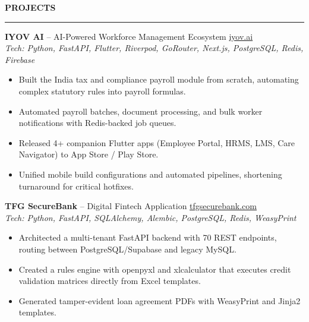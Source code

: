 \documentclass{resume}
\renewenvironment{rSection}[1]{
    \vspace{8pt}
    \noindent
    {\bfseries\MakeUppercase{#1}}
    \par
    \vspace{-3.5pt}
    \noindent\rule{\textwidth}{0.4pt}
    \par
    \vspace{4pt}
}{
    \vspace{3pt}
}
\begin{document}
\begin{rSection}{PROJECTS}



\textbf{IYOV AI} -- AI-Powered Workforce Management Ecosystem
\hfill \href{https://iyov.ai/}{iyov.ai} \\[-1pt]
\textit{Tech: Python, FastAPI, Flutter, Riverpod, GoRouter, Next.js, PostgreSQL, Redis, Firebase}

\vspace{-2pt}

\begin{itemize}
    \item Built the India tax and compliance payroll module from scratch, automating complex statutory rules into payroll formulas. %
    \item Automated payroll batches, document processing, and bulk worker notifications with Redis-backed job queues.
    \item Released 4+ companion Flutter apps (Employee Portal, HRMS, LMS, Care Navigator) to App Store / Play Store.
    \item Unified mobile build configurations and automated pipelines, shortening turnaround for critical hotfixes.
\end{itemize}

\vspace{3pt}



\textbf{TFG SecureBank} -- Digital Fintech Application
\hfill \href{https://tfgsecurebank.com/}{tfgsecurebank.com} \\[-1pt]
\textit{Tech: Python, FastAPI, SQLAlchemy, Alembic, PostgreSQL, Redis, WeasyPrint}

\vspace{-2pt}

\begin{itemize}
    \item Architected a multi-tenant FastAPI backend with 70 REST endpoints, routing between PostgreSQL/Supabase and legacy MySQL.
    \item Created a rules engine with openpyxl and xlcalculator that executes credit validation matrices directly from Excel templates.
    \item Generated tamper-evident loan agreement PDFs with WeasyPrint and Jinja2 templates.
\end{itemize}


\end{rSection}
\end{document}
